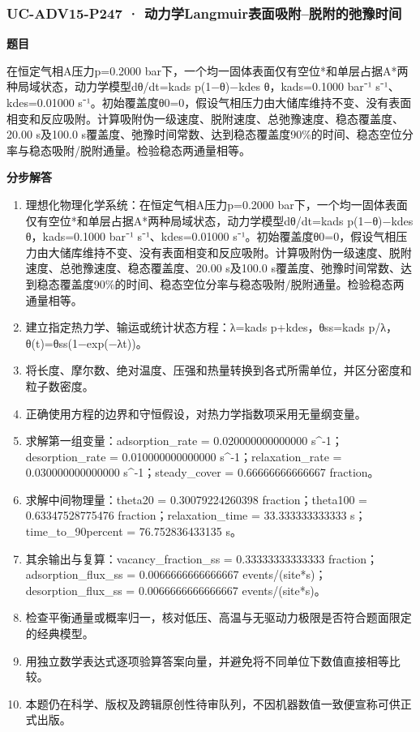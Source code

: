 \documentclass[UTF8,11pt,a4paper]{ctexart}
\begin{document}
\subsubsection*{UC-ADV15-P247 · 动力学Langmuir表面吸附–脱附的弛豫时间}
\noindent\textbf{题目}\par
在恒定气相A压力p=0.2000 bar下，一个均一固体表面仅有空位*和单层占据A*两种局域状态，动力学模型dθ/dt=kads p(1−θ)−kdes θ，kads=0.1000 bar⁻¹ s⁻¹、kdes=0.01000 s⁻¹。初始覆盖度θ0=0，假设气相压力由大储库维持不变、没有表面相变和反应吸附。计算吸附伪一级速度、脱附速度、总弛豫速度、稳态覆盖度、20.00 s及100.0 s覆盖度、弛豫时间常数、达到稳态覆盖度90\%的时间、稳态空位分率与稳态吸附/脱附通量。检验稳态两通量相等。\par
\medskip\noindent\textbf{分步解答}
\begin{enumerate}
\item 理想化物理化学系统：在恒定气相A压力p=0.2000 bar下，一个均一固体表面仅有空位*和单层占据A*两种局域状态，动力学模型dθ/dt=kads p(1−θ)−kdes θ，kads=0.1000 bar⁻¹ s⁻¹、kdes=0.01000 s⁻¹。初始覆盖度θ0=0，假设气相压力由大储库维持不变、没有表面相变和反应吸附。计算吸附伪一级速度、脱附速度、总弛豫速度、稳态覆盖度、20.00 s及100.0 s覆盖度、弛豫时间常数、达到稳态覆盖度90\%的时间、稳态空位分率与稳态吸附/脱附通量。检验稳态两通量相等。
\item 建立指定热力学、输运或统计状态方程：λ=kads p+kdes，θss=kads p/λ，θ(t)=θss(1−exp(−λt))。
\item 将长度、摩尔数、绝对温度、压强和热量转换到各式所需单位，并区分密度和粒子数密度。
\item 正确使用方程的边界和守恒假设，对热力学指数项采用无量纲变量。
\item 求解第一组变量：adsorption\_rate = 0.020000000000000 s\textasciicircum{}-1；desorption\_rate = 0.010000000000000 s\textasciicircum{}-1；relaxation\_rate = 0.030000000000000 s\textasciicircum{}-1；steady\_cover = 0.66666666666667 fraction。
\item 求解中间物理量：theta20 = 0.30079224260398 fraction；theta100 = 0.63347528775476 fraction；relaxation\_time = 33.333333333333 s；time\_to\_90percent = 76.752836433135 s。
\item 其余输出与复算：vacancy\_fraction\_ss = 0.33333333333333 fraction；adsorption\_flux\_ss = 0.0066666666666667 events/(site*s)；desorption\_flux\_ss = 0.0066666666666667 events/(site*s)。
\item 检查平衡通量或概率归一，核对低压、高温与无驱动力极限是否符合题面限定的经典模型。
\item 用独立数学表达式逐项验算答案向量，并避免将不同单位下数值直接相等比较。
\item 本题仍在科学、版权及跨辑原创性待审队列，不因机器数值一致便宣称可供正式出版。
\end{enumerate}
\end{document}
